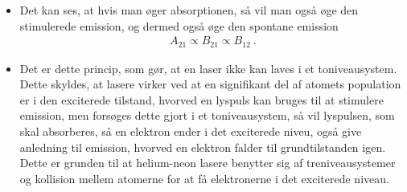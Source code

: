 \begin{itemize}
    \item Det kan ses, at hvis man øger absorptionen, så vil man også øge den stimulerede emission, og dermed også øge den spontane emission
    \begin{align*}
        A_{21} \propto B_{21} \propto B_{12} \: .
    \end{align*}
    \item Det er dette princip, som gør, at en laser ikke kan laves i et toniveausystem. Dette skyldes, at lasere virker ved at en signifikant del af atomets population er i den exciterede tilstand, hvorved en lyspuls kan bruges til at stimulere emission, men forsøges dette gjort i et toniveausystem, så vil lyspulsen, som skal absorberes, så en elektron ender i det exciterede niveu, også give anledning til emission, hvorved en elektron falder til grundtilstanden igen. Dette er grunden til at helium-neon lasere benytter sig af treniveausystemer og kollision mellem atomerne for at få elektronerne i det exciterede niveau.
\end{itemize}
\normalsize